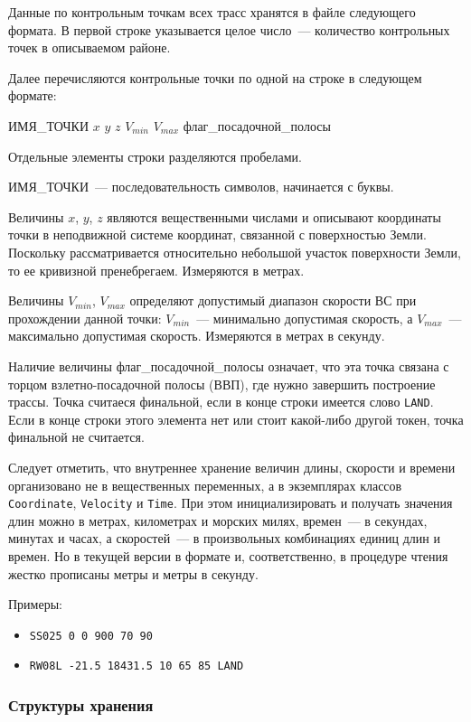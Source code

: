 \documentclass[12pt]{article}
\theoremstyle{plain}
\begin{document}
Данные по контрольным точкам всех трасс хранятся в файле следующего формата. В первой строке указывается целое число~--- количество контрольных точек в описываемом районе.

Далее перечисляются контрольные точки по одной на строке в следующем формате:
\begin{center}
ИМЯ\_ТОЧКИ $x$ $y$ $z$ $V_{min}$ $V_{max}$ флаг\_посадочной\_полосы
\end{center}
Отдельные элементы строки разделяются пробелами.

ИМЯ\_ТОЧКИ~--- последовательность символов, начинается с буквы. 

Величины $x$, $y$, $z$ являются вещественными числами и описывают координаты точки в неподвижной системе координат, связанной с поверхностью Земли. Поскольку рассматривается относительно небольшой участок поверхности Земли, то ее кривизной пренебрегаем. Измеряются в метрах.

Величины $V_{min}$, $V_{max}$ определяют допустимый диапазон скорости ВС при прохождении данной точки: $V_{min}$~--- минимально допустимая скорость, а $V_{max}$~--- максимально допустимая скорость. Измеряются в метрах в секунду.

Наличие величины флаг\_посадочной\_полосы означает, что эта точка связана с торцом взлетно-посадочной полосы (ВВП), где нужно завершить построение трассы. Точка считаеся финальной, если в конце строки имеется слово \texttt{LAND}. Если в конце строки этого элемента нет или стоит какой-либо другой токен, точка финальной не считается.

\medskip

Следует отметить, что внутреннее хранение величин длины, скорости и времени организовано не в вещественных переменных, а в экземплярах классов \texttt{Coordinate}, \texttt{Velocity} и \texttt{Time}. При этом инициализировать и получать значения длин можно в метрах, километрах и морских милях, времен~--- в секундах, минутах и часах, а скоростей~--- в произвольных комбинациях единиц длин и времен. Но в текущей версии в формате и, соответственно, в процедуре чтения жестко прописаны метры и метры в секунду.

Примеры:

\begin{itemize}
  \item  \texttt{SS025 0 0 900 70 90}
  \item  \texttt{RW08L -21.5 18431.5 10 65 85 LAND}
\end{itemize}


\subsubsection{Структуры хранения}
\label{sec:PointStructures}
\end{document}
